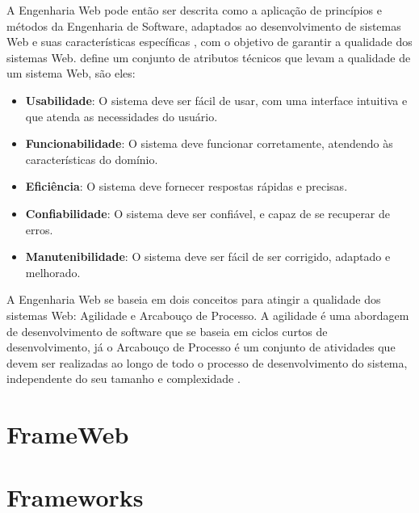 A Engenharia Web pode então ser descrita como a aplicação de princípios e métodos da Engenharia
de Software, adaptados ao desenvolvimento de sistemas Web e suas características específicas 
\cite{beder:2017,murugesan:2001}, com o objetivo de garantir a qualidade dos sistemas Web. 
\cite{olsina:2001} define um conjunto de atributos técnicos que levam a qualidade de um sistema Web,
são eles:

\begin{itemize}
    \item \textbf{Usabilidade}: O sistema deve ser fácil de usar, com uma interface intuitiva e 
        que atenda as necessidades do usuário.
    \item \textbf{Funcionabilidade}: O sistema deve funcionar corretamente, atendendo às características
        do domínio.
    \item \textbf{Eficiência}: O sistema deve fornecer respostas rápidas e precisas.
    \item \textbf{Confiabilidade}: O sistema deve ser confiável, e capaz de se recuperar de erros.
    \item \textbf{Manutenibilidade}: O sistema deve ser fácil de ser corrigido, adaptado e melhorado.
\end{itemize}

A Engenharia Web se baseia em dois conceitos para atingir a qualidade dos sistemas Web: Agilidade e Arcabouço de Processo.
A agilidade é uma abordagem de desenvolvimento de software que se baseia em ciclos curtos de desenvolvimento,
já o Arcabouço de Processo é um conjunto de atividades que devem ser realizadas ao longo de todo o processo
de desenvolvimento do sistema, independente do seu tamanho e complexidade \cite{beder:2017}.


\section{FrameWeb}
\label{sec-fundteo-frameweb}



\section{Frameworks}
\label{sec-fundteo-framework}


